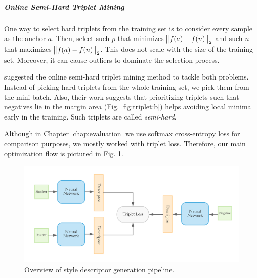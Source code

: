 \subparagraph*{Online Semi-Hard Triplet Mining} One way to select hard triplets from the training set is to consider every sample as the anchor $a$. Then, select such $p$ that minimizes $\norm{f(a) - f(n)}_2$ and such $n$ that maximizes $\norm{f(a) - f(n)}_2$. This does not scale with the size of the training set. Moreover, it can cause outliers to dominate the selection process. 

 suggested the online semi-hard triplet mining method to tackle both problems. Instead of picking hard triplets from the whole training set, we pick them from the mini-batch. Also, their work suggests that prioritizing triplets such that negatives lie in the margin area (Fig. \ref{fig:triplet:b}) helps avoiding local minima early in the training. Such triplets are called \textit{semi-hard}.

Although in Chapter \ref{chap:evaluation} we use softmax cross-entropy loss for comparison purposes, we mostly worked with triplet loss.  Therefore, our main optimization flow is pictured in Fig. \ref{fig:triplet_overall}.

\begin{figure}[hbpt]
	\centering
	\includegraphics[width=\linewidth]{imgs/triplet_loss_architecture.pdf}
	\caption{Overview of style descriptor generation pipeline.}
	\label{fig:triplet_overall}
\end{figure}

